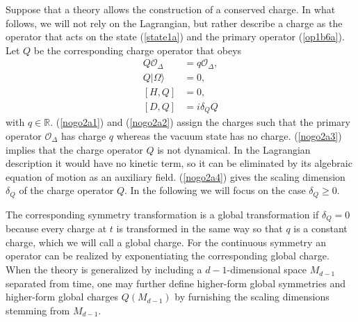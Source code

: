 \documentclass[12pt]{article}
\numberwithin{equation}{section}
\begin{document}
Suppose that 
a theory allows the construction of a conserved charge. 
In what follows, we will not rely on the Lagrangian, but rather 
describe a charge as the operator that acts on the state (\ref{state1a}) and the primary operator (\ref{op1b6a}).   
Let $Q$ be the corresponding charge operator that obeys 
\begin{align}
\label{nogo2a1}
Q\mathcal{O}_{\Delta}&=q\mathcal{O}_{\Delta},\\
\label{nogo2a2}
Q|\Omega\rangle&=0,\\
\label{nogo2a3}
[H,Q]&=0,\\
\label{nogo2a4}
[D,Q]&=i\delta_{Q}Q
\end{align}
with $q\in \mathbb{R}$. 
(\ref{nogo2a1}) and (\ref{nogo2a2}) assign the charges 
such that the primary operator $\mathcal{O}_{\Delta}$ has charge $q$ whereas the vacuum state has no charge. 
(\ref{nogo2a3}) implies that 
the charge operator $Q$ is not dynamical. 
In the Lagrangian description it would have no kinetic term, 
so it can be eliminated by its algebraic equation of motion as an auxiliary field. 
%
(\ref{nogo2a4}) gives the scaling dimension $\delta_{Q}$ of the charge operator $Q$. 
In the following we will focus on the case $\delta_{Q}\ge0$. 





The corresponding symmetry transformation is a global transformation 
if $\delta_{Q}=0$ because every charge 
at $t$ is transformed in the same way so that 
$q$ is a constant charge, which we will call a global charge. 
For the continuous symmetry an operator can be realized 
by exponentiating the corresponding global charge. 
When the theory is generalized 
by including a $d-1$-dimensional space $M_{d-1}$ separated from time, 
one may further define higher-form global symmetries and higher-form global charges 
$Q(M_{d-1})$ \cite{Gaiotto:2014kfa} 
by furnishing the scaling dimensions stemming from $M_{d-1}$. 
\end{document}

